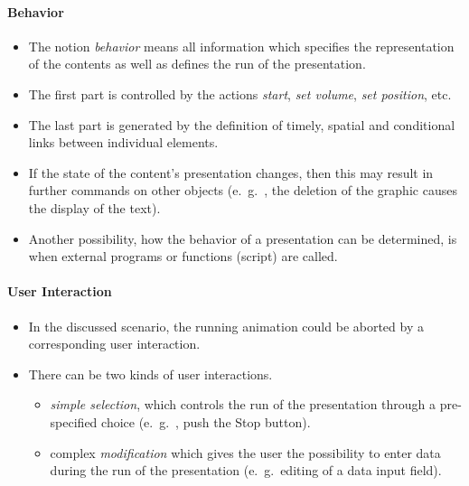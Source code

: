 \begin{multicols}{2}
	\paragraph*{Behavior}
	\begin{itemize}
	\item The notion \textit{behavior} means all information which specifies the representation of the contents as well as defines the run of the presentation. 
	\item The first part is controlled by the actions \textit{start}, \textit{set volume}, \textit{set position}, etc.
	\item The last part is generated by the definition of timely, spatial and conditional links between individual elements. 
	\item If the state of the content's presentation changes, then this may result in further commands on other objects (e.\ g.\ , the deletion of the graphic causes the display of the text). 
	\item Another possibility, how the behavior of a presentation can be determined, is when external programs or functions (script) are called.
	\end{itemize}
\end{multicols}




\begin{multicols}{2}
	\paragraph*{User Interaction}
	\begin{itemize}
		\item In the discussed scenario, the running animation could be aborted by a corresponding user interaction. 
		\item There can be two kinds of user interactions.
		\begin{itemize}
			\item \textit{simple selection}, which controls the run of the presentation through a pre-specified choice (e.\ g.\ , push the Stop button). 
			\item complex \textit{modification} which gives the user the possibility to enter data during the run of the presentation (e.\ g.\, editing of a	data input field).
		\end{itemize}
	\end{itemize}
\end{multicols}



